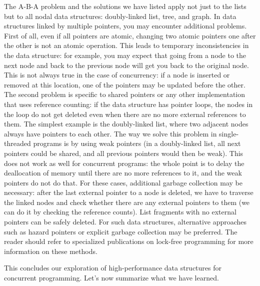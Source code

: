 The A-B-A problem and the solutions we have listed apply not just to the lists but to all nodal data structures: doubly-linked list, tree, and graph. In data structures linked by multiple pointers, you may encounter additional problems. First of all, even if all pointers are atomic, changing two atomic pointers one after the other is not an atomic operation. This leads to temporary inconsistencies in the data structure: for example, you may expect that going from a node to the next node and back to the previous node will get you back to the original node. This is not always true in the case of concurrency: if a node is inserted or removed at this location, one of the pointers may be updated before the other. The second problem is specific to shared pointers or any other implementation that uses reference counting: if the data structure has pointer loops, the nodes in the loop do not get deleted even when there are no more external references to them. The simplest example is the doubly-linked list, where two adjacent nodes always have pointers to each other. The way we solve this problem in single-threaded programs is by using weak pointers (in a doubly-linked list, all next pointers could be shared, and all previous pointers would then be weak). This does not work as well for concurrent programs: the whole point is to delay the deallocation of memory until there are no more references to it, and the weak pointers do not do that. For these cases, additional garbage collection may be necessary: after the last external pointer to a node is deleted, we have to traverse the linked nodes and check whether there are any external pointers to them (we can do it by checking the reference counts). List fragments with no external pointers can be safely deleted. For such data structures, alternative approaches such as hazard pointers or explicit garbage collection may be preferred. The reader should refer to specialized publications on lock-free programming for more information on these methods. 

This concludes our exploration of high-performance data structures for concurrent programming. Let's now summarize what we have learned.













